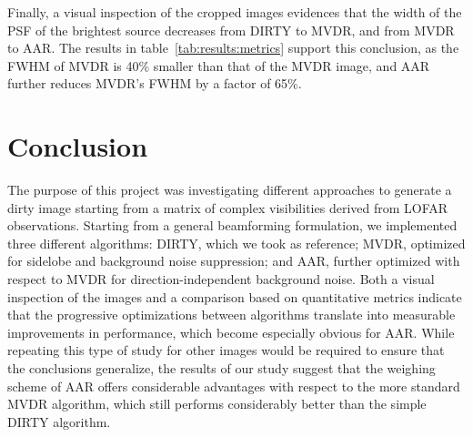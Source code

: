 \documentclass[11pt]{article}
\begin{document}
Finally, a visual inspection of the cropped images evidences that the width of the PSF of the brightest source decreases from DIRTY to MVDR, and from MVDR to AAR.
The results in table~\ref{tab:results:metrics} support this conclusion, as the FWHM of MVDR is 40\% smaller than that of the MVDR image, and AAR further reduces MVDR's FWHM by a factor of 65\%.

\section{Conclusion}

The purpose of this project was investigating different approaches to generate a dirty image starting from a matrix of complex visibilities derived from LOFAR observations.
Starting from a general beamforming formulation, we implemented three different algorithms: DIRTY, which we took as reference; MVDR, optimized for sidelobe and background noise suppression; and AAR, further optimized with respect to MVDR for direction-independent background noise.
Both a visual inspection of the images and a comparison based on quantitative metrics indicate that the progressive optimizations between algorithms translate into measurable improvements in performance, which become especially obvious for AAR.
While repeating this type of study for other images would be required to ensure that the conclusions generalize, the results of our study suggest that the weighing scheme of AAR offers considerable advantages with respect to the more standard MVDR algorithm, which still performs considerably better than the simple DIRTY algorithm.

\cleardoublepage
\printbibliography
\end{document}
